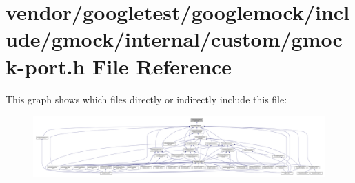 \hypertarget{custom_2gmock-port_8h}{}\section{vendor/googletest/googlemock/include/gmock/internal/custom/gmock-\/port.h File Reference}
\label{custom_2gmock-port_8h}
This graph shows which files directly or indirectly include this file\+:
\nopagebreak
\begin{figure}[H]
\begin{center}
\leavevmode
\includegraphics[width=350pt]{custom_2gmock-port_8h__dep__incl}
\end{center}
\end{figure}

